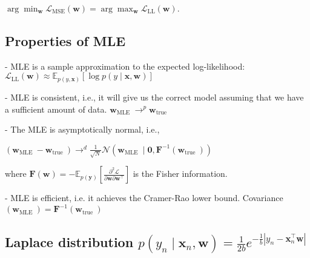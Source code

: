 $\arg \min _{\mathbf{w}} \mathcal{L}_{\mathrm{MSE}}(\mathbf{w})=\arg \max _{\mathbf{w}} \mathcal{L}_{\mathrm{LL}}(\mathbf{w})$.


\subsection*{Properties of MLE}
- MLE is a sample approximation to the expected log-likelihood:
$
\mathcal{L}_{\mathrm{LL}}(\mathbf{w}) \approx \mathbb{E}_{p(y, \mathbf{x})}[\log p(y \mid \mathbf{x}, \mathbf{w})]
$

- MLE is consistent, i.e., it will give us the correct model assuming that we have a sufficient amount of data.
$\mathbf{w}_{\text {MLE }} \longrightarrow^{p} \mathbf{w}_{\text {true }}$

- The MLE is asymptotically normal, i.e.,

$(\mathbf{w}_{\text {MLE }}-\mathbf{w}_{\text {true }}) \longrightarrow^{d} \frac{1}{\sqrt{N}} \mathcal{N}(\mathbf{w}_{\text {MLE }} \mid \mathbf{0}, \mathbf{F}^{-1}(\mathbf{w}_{\text {true }}))$

where $\mathbf{F}(\mathbf{w})=-\mathbb{E}_{p(\mathbf{y})}[\frac{\partial^{2} \mathcal{L}}{\partial \mathbf{w} \partial \mathbf{w}^{\top}}]$ is the Fisher information.

- MLE is efficient, i.e. it achieves the Cramer-Rao lower bound. Covariance $(\mathbf{w}_{\text {MLE }})=\mathbf{F}^{-1}(\mathbf{w}_{\text {true }})$

\subsection*{Laplace distribution $
p(y_{n} \mid \mathbf{x}_{n}, \mathbf{w})=\frac{1}{2 b} e^{-\frac{1}{b}|y_{n}-\mathbf{x}_{n}^{\top} \mathbf{w}|}
$}

